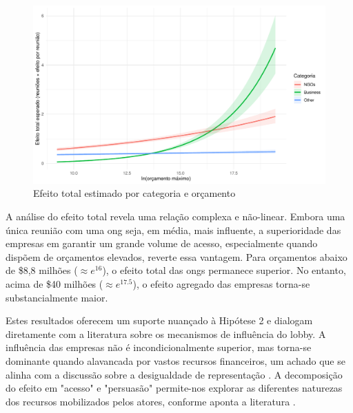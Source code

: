 \begin{figure}[htbp]
    \centering
    \includegraphics[width=\textwidth]{figures/h2_test/fig_total_effect_vs_budget_by_category.pdf}
    \caption{Efeito total estimado por categoria e orçamento}
    \label{fig:h2_total_effects}
\end{figure}

A análise do efeito total revela uma relação complexa e não-linear. Embora uma única reunião com uma \acrshort{ong} seja, em média, mais influente, a superioridade das empresas em garantir um grande volume de acesso, especialmente quando dispõem de orçamentos elevados, reverte essa vantagem. Para orçamentos abaixo de \$8,8 milhões ($\approx e^{16}$), o efeito total das \acrshort{ong}s permanece superior. No entanto, acima de \$40 milhões ($\approx e^{17.5}$), o efeito agregado das empresas torna-se substancialmente maior.

Estes resultados oferecem um suporte nuançado à Hipótese 2 e dialogam diretamente com a literatura sobre os mecanismos de influência do lobby. A influência das empresas não é incondicionalmente superior, mas torna-se dominante quando alavancada por vastos recursos financeiros, um achado que se alinha com a discussão sobre a desigualdade de representação \cite{mahoney_lobbying_2007}. A decomposição do efeito em "acesso" e "persuasão" permite-nos explorar as diferentes naturezas dos recursos mobilizados pelos atores, conforme aponta a literatura \cite{de_figueiredo_advancing_2014, Pop2013Lobbying}.

